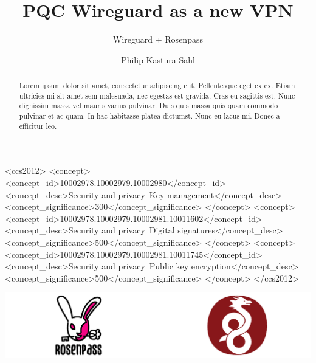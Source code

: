 \documentclass[sigconf]{acmart}
\begin{document}
\title{PQC Wireguard as a new VPN}
\subtitle{Wireguard + Rosenpass}

\author{Philip Kastura-Sahl}

\renewcommand{\shortauthors}{Philip Kastura-Sahl}

\begin{abstract}
Lorem ipsum dolor sit amet, consectetur adipiscing elit. Pellentesque eget ex ex. Etiam ultricies mi sit amet sem malesuada, nec egestas est gravida. Cras eu sagittis est. Nunc dignissim massa vel mauris varius pulvinar. Duis quis massa quis quam commodo pulvinar et ac quam. In hac habitasse platea dictumst. Nunc eu lacus mi. Donec a efficitur leo.
\end{abstract}


\begin{CCSXML}
<ccs2012>
   <concept>
       <concept_id>10002978.10002979.10002980</concept_id>
       <concept_desc>Security and privacy~Key management</concept_desc>
       <concept_significance>300</concept_significance>
       </concept>
   <concept>
       <concept_id>10002978.10002979.10002981.10011602</concept_id>
       <concept_desc>Security and privacy~Digital signatures</concept_desc>
       <concept_significance>500</concept_significance>
       </concept>
   <concept>
       <concept_id>10002978.10002979.10002981.10011745</concept_id>
       <concept_desc>Security and privacy~Public key encryption</concept_desc>
       <concept_significance>500</concept_significance>
       </concept>
 </ccs2012>
\end{CCSXML}



\begin{teaserfigure}
  \centering
  \includegraphics[width=\textwidth]{graphics/rosenpass+wireguard.pdf}
\end{teaserfigure}
\end{document}
